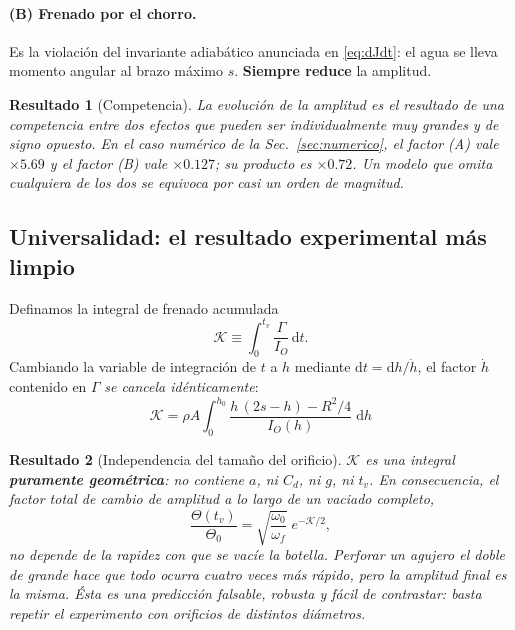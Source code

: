 \documentclass[11pt,a4paper]{article}
\newcommand{\dd}{\mathrm{d}}
\newtheorem{resultado}{Resultado}
\begin{document}
\paragraph{(B) Frenado por el chorro.} Es la violación del invariante adiabático anunciada en
\eqref{eq:dJdt}: el agua se lleva momento angular al brazo máximo $s$. \textbf{Siempre reduce} la
amplitud.

\begin{resultado}[Competencia]
La evolución de la amplitud es el resultado de una competencia entre dos efectos que pueden ser
\emph{individualmente muy grandes} y de signo opuesto. En el caso numérico de la
Sec.~\ref{sec:numerico}, el factor (A) vale $\times 5.69$ y el factor (B) vale $\times 0.127$; su
producto es $\times 0.72$. Un modelo que omita cualquiera de los dos se equivoca por casi un orden
de magnitud.
\end{resultado}

\subsection{Universalidad: el resultado experimental más limpio}
\label{sec:universalidad}

Definamos la integral de frenado acumulada
\begin{equation}
\mathcal K \equiv \int_0^{t_v}\frac{\Gamma}{I_O}\,\dd t .
\end{equation}
Cambiando la variable de integración de $t$ a $h$ mediante $\dd t = \dd h/\dot h$, el factor
$\dot h$ contenido en $\Gamma$ \emph{se cancela idénticamente}:
\begin{equation}
\boxed{\;
\mathcal K = \rho A \int_0^{h_0}
\frac{h\,(2s-h)-R^2/4}{\;I_O(h)\;}\;\dd h \;}
\label{eq:K}
\end{equation}

\begin{resultado}[Independencia del tamaño del orificio]
$\mathcal K$ es una integral \textbf{puramente geométrica}: no contiene $a$, ni $C_d$, ni $g$, ni
$t_v$. En consecuencia, el factor total de cambio de amplitud a lo largo de un vaciado completo,
\begin{equation}
\frac{\Theta(t_v)}{\Theta_0} = \sqrt{\frac{\omega_0}{\omega_f}}\;e^{-\mathcal K/2},
\end{equation}
\emph{no depende de la rapidez con que se vacíe la botella}. Perforar un agujero el doble de grande
hace que todo ocurra cuatro veces más rápido, pero la amplitud final es la misma.
Ésta es una predicción falsable, robusta y fácil de contrastar: basta repetir el experimento con
orificios de distintos diámetros.
\end{resultado}
\end{document}
